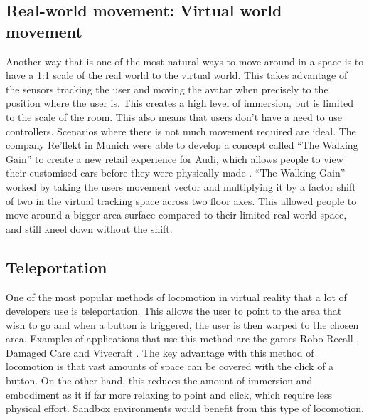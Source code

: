 \documentclass[12pt]{report}
\begin{document}
\subsection{Real-world movement: Virtual world movement} 
Another way that is one of the most natural ways to move around in a space is to have a 1:1 scale of the real world to the virtual world. This takes advantage of the sensors tracking the user and moving the avatar when precisely to the position where the user is. This creates a high level of immersion, but is limited to the scale of the room. This also means that users don’t have a need to use controllers. Scenarios where there is not much movement required are ideal. The company Re’flekt in Munich were able to develop a concept called “The Walking Gain” to create a new retail experience for Audi, which allows people to view their customised cars before they were physically made . “The Walking Gain” worked by taking the users movement vector and multiplying it by a factor shift of two in the virtual tracking space across two floor axes. This allowed people to move around a bigger area surface compared to their limited real-world space, and still kneel down without the shift.  

\subsection{Teleportation}
One of the most popular methods of locomotion in virtual reality that a lot of developers use is teleportation. This allows the user to point to the area that wish to go and when a button is triggered, the user is then warped to the chosen area. Examples of applications that use this method are the games Robo Recall , Damaged Care and Vivecraft . The key advantage with this method of locomotion is that vast amounts of space can be covered with the click of a button. On the other hand, this reduces the amount of immersion and embodiment as it if far more relaxing to point and click, which require less physical effort. Sandbox environments would benefit from this type of locomotion.
\end{document}
